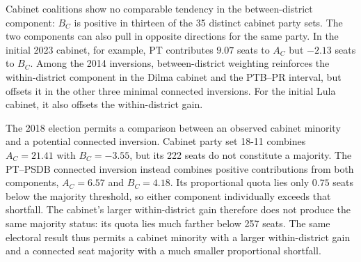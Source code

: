 \documentclass[11pt]{article}
\begin{document}
Cabinet coalitions show no comparable tendency in the between-district
component: \(B_C\) is positive in thirteen of the 35 distinct cabinet party
sets. The two components can also pull in opposite directions for the
same party. In the initial 2023 cabinet, for example, PT contributes
\(9.07\) seats to \(A_C\) but \(-2.13\) seats to \(B_C\). Among the
2014 inversions, between-district weighting reinforces the within-district
component in the Dilma cabinet and the PTB--PR interval, but offsets it
in the other three minimal connected inversions. For the initial Lula
cabinet, it also offsets the within-district gain.


The 2018 election permits a comparison between an observed cabinet
minority and a potential connected inversion. Cabinet party set 18-11
combines \(A_C=21.41\) with \(B_C=-3.55\), but its 222 seats do not
constitute a majority. The PT--PSDB connected inversion instead combines
positive contributions from both components, \(A_C=6.57\) and
\(B_C=4.18\). Its proportional quota lies only \(0.75\) seats below
the majority threshold, so either component individually exceeds that
shortfall. The cabinet's larger within-district gain therefore does not
produce the same majority status: its quota lies much farther below 257
seats. The same electoral result thus permits a cabinet minority with
a larger within-district gain and a connected seat majority with a much
smaller proportional shortfall.
\end{document}
